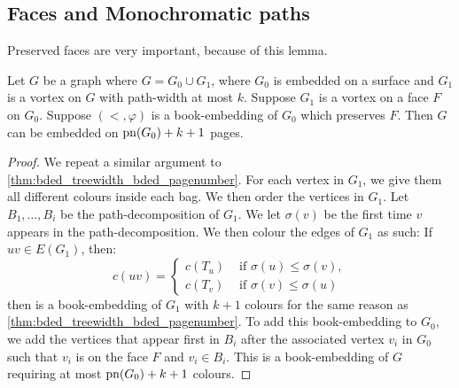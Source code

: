 \subsection{Faces and Monochromatic paths}

Preserved faces are very important, because of this lemma.

\begin{lemma}\label{lem:preserved_faces_pagenumber}
	Let \(G\) be a graph where \(G = G_0 \cup G_1\), where \(G_0\) is embedded on a surface and \(G_1\) is a vortex on \(G\) with path-width at most \(k\). Suppose \(G_1\) is a vortex on a face \(F\) on \(G_0\). Suppose $(<, \varphi)$ is a book-embedding of \(G_0\) which preserves \(F\). Then $G$ can be embedded on \(\operatorname{pn}(G_0) + k + 1\) pages.
\end{lemma}

\begin{proof}
	We repeat a similar argument to \cref{thm:bded_treewidth_bded_pagenumber}. For each vertex in \(G_1\), we give them all different colours inside each bag. We then order the vertices in \(G_1\). Let \(B_1, \ldots, B_i\) be the path-decomposition of \(G_1\). We let \(\sigma(v)\) be the first time \(v\) appears in the path-decomposition. We then colour the edges of \(G_1\) as such: If \(uv \in E(G_1)\), then:
	\begin{equation}
		c(uv) =
		\begin{cases}
			c(T_u) & \text{ if } \sigma(u) \leq \sigma(v), \\
			c(T_v) & \text{ if } \sigma(v) \leq \sigma(u)
		\end{cases}
	\end{equation}
	then is a book-embedding of \(G_1\) with \(k+1\) colours for the same reason as \cref{thm:bded_treewidth_bded_pagenumber}.
	To add this book-embedding to \(G_0\), we add the vertices that appear first in \(B_i\) after the associated vertex \(v_i\) in \(G_0\) such that \(v_i\) is on the face \(F\) and \(v_i \in B_i\). This is a book-embedding of \(G\) requiring at most \(\operatorname{pn}(G_0) + k + 1\) colours.
\end{proof}

